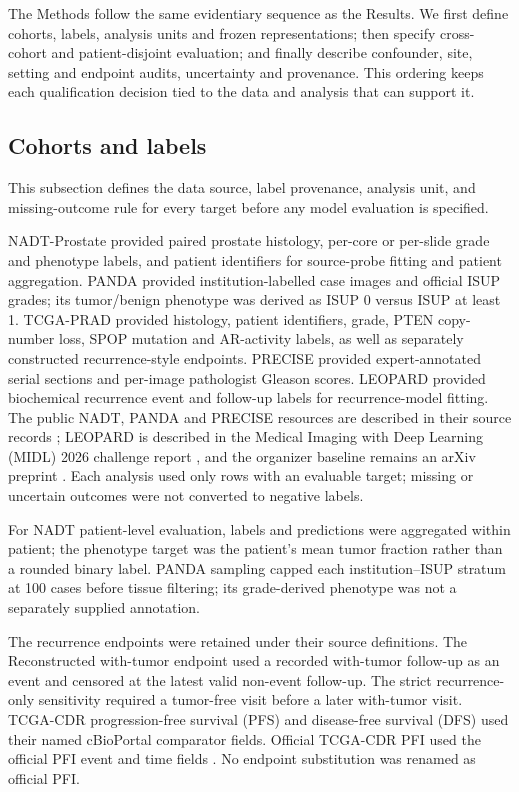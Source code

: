 The Methods follow the same evidentiary sequence as the Results. We first define cohorts,
labels, analysis units and frozen representations; then specify cross-cohort and
patient-disjoint evaluation; and finally describe confounder, site, setting and endpoint
audits, uncertainty and provenance. This ordering keeps each qualification decision tied to
the data and analysis that can support it.

\subsection{Cohorts and labels}

This subsection defines the data source, label provenance, analysis unit, and missing-outcome
rule for every target before any model evaluation is specified.

NADT-Prostate provided paired prostate histology, per-core or per-slide grade and phenotype
labels, and patient identifiers for source-probe fitting and patient aggregation. PANDA
provided institution-labelled case images and official ISUP grades; its tumor/benign
phenotype was derived as ISUP 0 versus ISUP at least 1. TCGA-PRAD provided histology,
patient identifiers, grade, PTEN copy-number loss, SPOP mutation and AR-activity labels, as
well as separately constructed recurrence-style endpoints. PRECISE provided expert-annotated
serial sections and per-image pathologist Gleason scores. LEOPARD provided biochemical
recurrence event and follow-up labels for recurrence-model fitting. The public NADT,
PANDA and PRECISE resources are described in their source records
\cite{nadt2021,panda2022,precise2026}; LEOPARD is described in the Medical Imaging with Deep
Learning (MIDL) 2026 challenge
report \cite{leopard2026}, and the organizer baseline remains an arXiv preprint
\cite{grisi2026}. Each analysis used only
rows with an evaluable target; missing or uncertain outcomes were not converted to negative
labels.

For NADT patient-level evaluation, labels and predictions were aggregated within patient;
the phenotype target was the patient's mean tumor fraction rather than a rounded binary
label. PANDA sampling capped each institution--ISUP stratum at 100 cases before tissue
filtering; its grade-derived phenotype was not a separately supplied annotation.

The recurrence endpoints were retained under their source definitions. The Reconstructed
with-tumor endpoint used a recorded with-tumor follow-up as an event and censored at the
latest valid non-event follow-up. The strict recurrence-only sensitivity required a
tumor-free visit before a later with-tumor visit. TCGA-CDR progression-free survival (PFS)
and disease-free survival (DFS) used their named cBioPortal comparator fields. Official
TCGA-CDR PFI used the official PFI event and time
fields \cite{tcgacdr2018}. No
endpoint substitution was renamed as official PFI.

